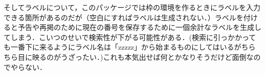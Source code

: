 \documentclass[11pt, a4paper]{ltjsarticle}
\begin{document}
そしてラベルについて，このパッケージでは枠の環境を作るときにラベルを入力できる箇所があるのだが（空白にすればラベルは生成されない．）ラベルを付けると予告や再掲のために現在の番号を保存するために一個余計なラベルを生成してしまう．こいつのせいで検索性が下がる可能性がある．(検索に引っかかっても一番下に来るようにラベル名は「zzzzz」から始まるものにしてはいるがちらちら目に映るのがうざったい．)これも本気出せば何とかなりそうだけど面倒なのでやらない．
\end{document}
